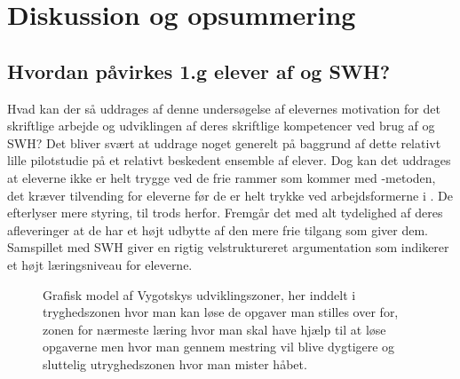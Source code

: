 \chapter{Diskussion og opsummering}
\label{Ch:5}

\section{Hvordan påvirkes 1.g elever af \ib{} og SWH?}
\label{sec:ibseswh}
Hvad kan der så uddrages af denne undersøgelse af elevernes motivation for det skriftlige arbejde og udviklingen af deres skriftlige kompetencer ved brug af \ib{} og SWH? Det bliver svært at uddrage noget generelt på baggrund af dette relativt lille pilotstudie på et relativt beskedent ensemble af elever. Dog kan det uddrages at eleverne ikke er helt trygge ved de frie rammer som kommer med \ib{}-metoden, det kræver tilvending for eleverne før de er helt trykke ved arbejdsformerne i \ib{}. De efterlyser mere styring, til trods herfor. Fremgår det med alt tydelighed af deres afleveringer at de har et højt udbytte af den mere frie tilgang som \ib{} giver dem. Samspillet med SWH giver en rigtig velstruktureret argumentation som indikerer et højt læringsniveau for eleverne. 

\begin{figure}[h!]
	\centering
	\usetikzlibrary{decorations.text}
	\caption[Vygotskys udviklingszoner]{Grafisk model af Vygotskys udviklingszoner, her inddelt i tryghedszonen hvor man kan løse de opgaver man stilles over for, zonen for nærmeste læring hvor man skal have hjælp til at løse opgaverne men hvor man gennem mestring vil blive dygtigere og sluttelig utryghedszonen hvor man mister håbet. }
	\label{fig:vyg}
\end{figure}

